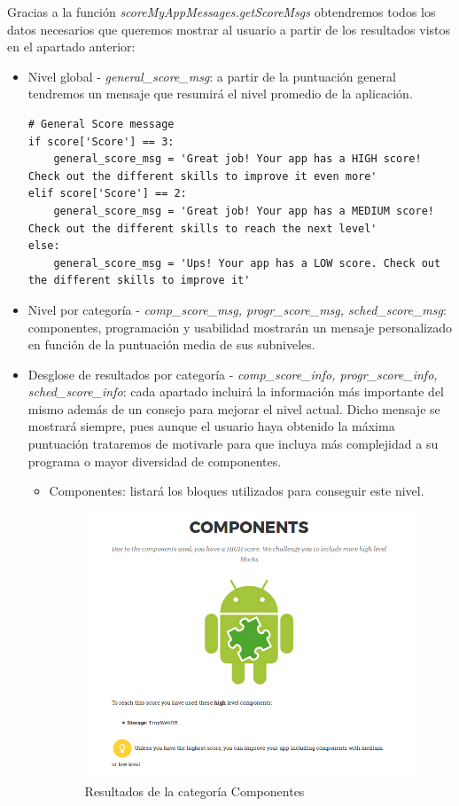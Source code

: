 \documentclass[a4paper, 12pt]{book}
\begin{document}
Gracias a la función \textit{scoreMyAppMessages.getScoreMsgs} obtendremos todos los datos necesarios que queremos mostrar al usuario a partir de los resultados vistos en el apartado anterior:
\begin{itemize}
	\item Nivel global - \textit{general\_score\_msg}: a partir de la puntuación general tendremos un mensaje que resumirá el nivel promedio de la aplicación. 
		\begin{lstlisting}
# General Score message
if score['Score'] == 3:
	general_score_msg = 'Great job! Your app has a HIGH score! Check out the different skills to improve it even more'
elif score['Score'] == 2:
	general_score_msg = 'Great job! Your app has a MEDIUM score! Check out the different skills to reach the next level'
else:
	general_score_msg = 'Ups! Your app has a LOW score. Check out the different skills to improve it'
		\end{lstlisting}
	\item Nivel por categoría - \textit{comp\_score\_msg, progr\_score\_msg, sched\_score\_msg}: componentes, programación y usabilidad mostrarán un mensaje personalizado en función de la puntuación media de sus subniveles. 
	\item Desglose de resultados por categoría - \textit{comp\_score\_info, progr\_score\_info, sched\_score\_info}: cada apartado incluirá la información más importante del mismo además de un consejo para mejorar el nivel actual. Dicho mensaje se mostrará siempre, pues aunque el usuario haya obtenido la máxima puntuación trataremos de motivarle para que incluya más complejidad a su programa o mayor diversidad de componentes. 
	\begin{itemize}
		\item Componentes: listará los bloques utilizados para conseguir este nivel.  
		\begin{figure}[H]
			  \centering
			  \includegraphics[width=0.50\linewidth, keepaspectratio]{img/componentsScore}
			  \caption{Resultados de la categoría Componentes}

\end{figure}
\end{itemize}
\end{itemize}
\end{document}
